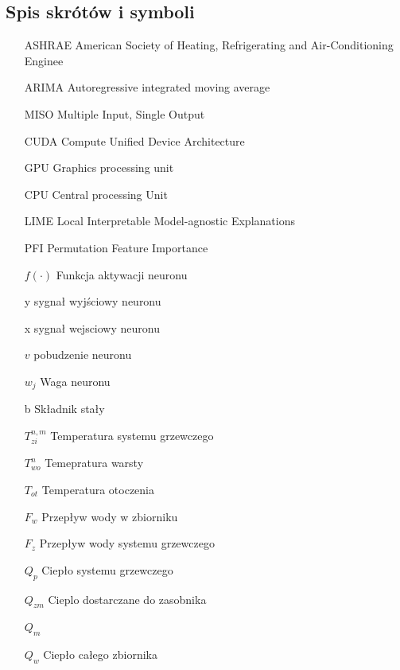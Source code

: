 \documentclass[a4paper,twoside,12pt]{book}
\begin{document}
\backmatter

\printbibliography           %

\begin{appendices}

  \chapter{Spis skrótów i symboli}

  \begin{itemize}
    \item[ASHRAE] American Society of Heating, Refrigerating and Air-Conditioning Enginee
    \item[ARIMA] Autoregressive integrated moving average
    \item[MISO] Multiple Input, Single Output
    \item[CUDA] Compute Unified Device Architecture
    \item[GPU] Graphics processing unit
    \item[CPU] Central processing Unit
    \item[LIME] Local Interpretable Model-agnostic Explanations
    \item[PFI] Permutation Feature Importance
    \item[$f(\cdot)$] Funkcja aktywacji neuronu
    \item[y] sygnał wyjściowy neuronu
    \item[x] sygnał wejsciowy neuronu
    \item[$v$] pobudzenie neuronu
    \item[$w_j$]  Waga neuronu
    \item[b] Składnik stały
    \item[$T_{zi}^{n,m}$] Temperatura systemu grzewczego
    \item[$T_{wo}^{n}$] Temepratura warsty
    \item[$T_{ot}$] Temperatura otoczenia
    \item[$F_w$] Przepływ wody w zbiorniku
    \item[$F_z$] Przepływ wody systemu grzewczego
    \item[$Q_p$] Ciepło systemu grzewczego
    \item[$Q_{zm}$] Cieplo dostarczane do zasobnika
    \item[$Q_m$]
    \item[$Q_w$] Ciepło całego zbiornika

\end{itemize}
\end{appendices}
\end{document}
